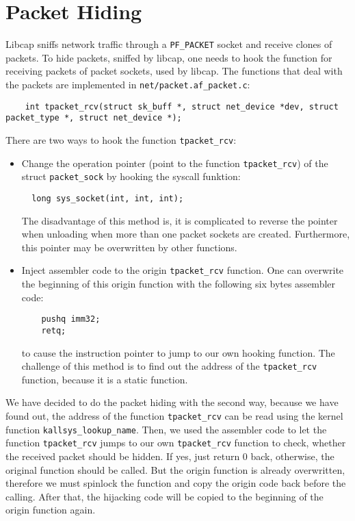 \section{Packet Hiding}
Libcap sniffs network traffic through a \texttt{PF\_PACKET} socket and receive clones 
of packets. To hide packets, sniffed by libcap, one needs to hook the 
function for receiving packets of packet sockets, used by libcap. The 
functions that deal with the packets are implemented in \verb+net/packet.af_packet.c+: 
\begin{center}
\lstset{escapechar=,style=customc}
	\begin{lstlisting}
  	int tpacket_rcv(struct sk_buff *, struct net_device *dev, struct packet_type *, struct net_device *); 
	\end{lstlisting}
\end{center}
There are two ways to hook the function \texttt{tpacket\_rcv}:
\begin{itemize}
\item Change the operation pointer (point to the function \texttt{tpacket\_rcv}) of the struct \texttt{packet\_sock} by hooking the syscall funktion:
\begin{center}
\lstset{escapechar=,style=customc}
	\begin{lstlisting}
  long sys_socket(int, int, int);
		\end{lstlisting}
\end{center}
The disadvantage of this method is, it is complicated to reverse the pointer when unloading when more than one packet sockets are created. Furthermore, this pointer may be overwritten by other functions.
\item Inject assembler code to the origin \texttt{tpacket\_rcv} function. One can overwrite the beginning of this origin function with the following six bytes assembler code:
\begin{center}
\lstset{escapechar=,style=customc}
	\begin{lstlisting}
    pushq imm32;
    retq;
	\end{lstlisting}
\end{center}
to cause the instruction pointer to jump to our own hooking function. The challenge of this method is to find out the address of the \texttt{tpacket\_rcv} function, because it is a static function.  
\end{itemize}
We have decided to do the packet hiding with the second way, because we have found out, the address of the function \texttt{tpacket\_rcv} can be read using the kernel function \texttt{kallsys\_lookup\_name}. Then, we used the assembler code to let the function \texttt{tpacket\_rcv} jumps to our own \texttt{tpacket\_rcv} function to check, whether the received packet should be hidden. If yes, just return 0 back, otherwise, the original function should be called. But the origin function is already overwritten, therefore we must spinlock the function and copy the origin code back before the calling. After that, the hijacking code will be copied to the beginning of the origin function again. \\
